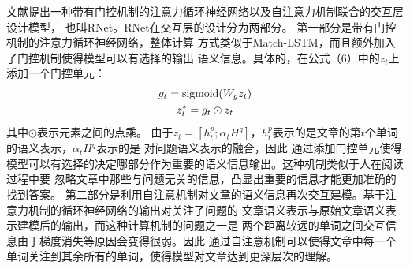 文献\cite{RNet}提出一种带有门控机制的注意力循环神经网络以及自注意力机制联合的交互层设计模型，
也叫RNet。RNet在交互层的设计分为两部分。
第一部分是带有门控机制的注意力循环神经网络，整体计算
方式类似于Match-LSTM，而且额外加入了门控机制使得模型可以有选择的输出
语义信息。具体的，在公式（6）中的$z_t$上添加一个门控单元：
\begin{gather}
g_t=\text{sigmoid}(W_gz_t)\notag \\
z_t^{*}=g_t\odot z_t
\end{gather}
其中$\odot$表示元素之间的点乘。
由于$z_t=[h_t^p;\alpha_tH^q]$，$h_t^p$表示的是文章的第$t$个单词的语义表示，$\alpha_tH^q$表示的是
对问题语义表示的融合，因此
通过添加门控单元使得模型可以有选择的决定哪部分作为重要的语义信息输出。这种机制类似于人在阅读过程中要
忽略文章中那些与问题无关的信息，凸显出重要的信息才能更加准确的找到答案。
第二部分是利用自注意机制对文章的语义信息再次交互建模。基于注意力机制的循环神经网络的输出对关注了问题的
文章语义表示与原始文章语义表示建模后的输出，而这种计算机制的问题之一是
两个距离较远的单词之间交互信息由于梯度消失等原因会变得很弱。因此
通过自注意机制可以使得文章中每一个单词关注到其余所有的单词，使得模型对文章达到更深层次的理解。


